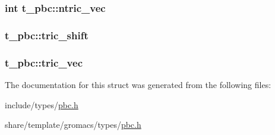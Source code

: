 \hypertarget{structt__pbc_aa988d855d114cf5c595d3d2c8adeeeb9}{
\subsubsection[{ntric\-\_\-vec}]{\setlength{\rightskip}{0pt plus 5cm}int {\bf t\-\_\-pbc\-::ntric\-\_\-vec}}}\label{structt__pbc_aa988d855d114cf5c595d3d2c8adeeeb9}
\hypertarget{structt__pbc_a1d8482139f9f5080deecddb23c5257fc}{
\subsubsection[{tric\-\_\-shift}]{ {\bf t\-\_\-pbc\-::tric\-\_\-shift}}}\label{structt__pbc_a1d8482139f9f5080deecddb23c5257fc}
\hypertarget{structt__pbc_a57973718dabba5bab00a6b395f76e140}{
\subsubsection[{tric\-\_\-vec}]{ {\bf t\-\_\-pbc\-::tric\-\_\-vec}}}\label{structt__pbc_a57973718dabba5bab00a6b395f76e140}


\-The documentation for this struct was generated from the following files\-:\begin{DoxyCompactItemize}
\item 
include/types/\hyperlink{include_2types_2pbc_8h}{pbc.\-h}\item 
share/template/gromacs/types/\hyperlink{share_2template_2gromacs_2types_2pbc_8h}{pbc.\-h}\end{DoxyCompactItemize}
